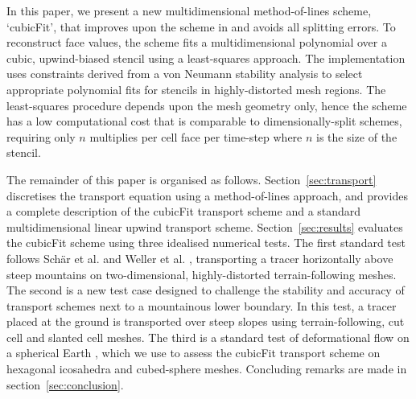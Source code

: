 In this paper, we present a new multidimensional method-of-lines scheme, `cubicFit', that improves upon the scheme in \citep{weller-shahrokhi2014} and avoids all splitting errors.  To reconstruct face values, the scheme fits a multidimensional polynomial over a cubic, upwind-biased stencil using a least-squares approach.  The implementation uses constraints derived from a von Neumann stability analysis to select appropriate polynomial fits for stencils in highly-distorted mesh regions.  The least-squares procedure depends upon the mesh geometry only, hence the scheme has a low computational cost that is comparable to dimensionally-split schemes, requiring only $n$ multiplies per cell face per time-step where $n$ is the size of the stencil.

The remainder of this paper is organised as follows.
Section~\ref{sec:transport} discretises the transport equation using a method-of-lines approach, and provides a complete description of the cubicFit transport scheme and a standard multidimensional linear upwind transport scheme.  Section~\ref{sec:results} evaluates the cubicFit scheme using three idealised numerical tests.
The first standard test follows Sch\"ar et al. \citep{schaer2002} and Weller et al. \citep{weller2017}, transporting a tracer horizontally above steep mountains on two-dimensional, highly-distorted terrain-following meshes.
The second is a new test case designed to challenge the stability and accuracy of transport schemes next to a mountainous lower boundary.  In this test, a tracer placed at the ground is transported over steep slopes using terrain-following, cut cell and slanted cell meshes.
The third is a standard test of deformational flow on a spherical Earth \citep{lauritzen2012}, which we use to assess the cubicFit transport scheme on hexagonal icosahedra and cubed-sphere meshes.
Concluding remarks are made in section~\ref{sec:conclusion}.






